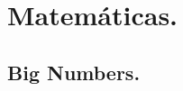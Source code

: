 \documentclass[10pt, letterpaper, twoside]{article}
\begin{document}

\section{Matemáticas.}

%
%
%
%
%
%
%
%
%
%

\subsection{Big Numbers.}
\end{document}
